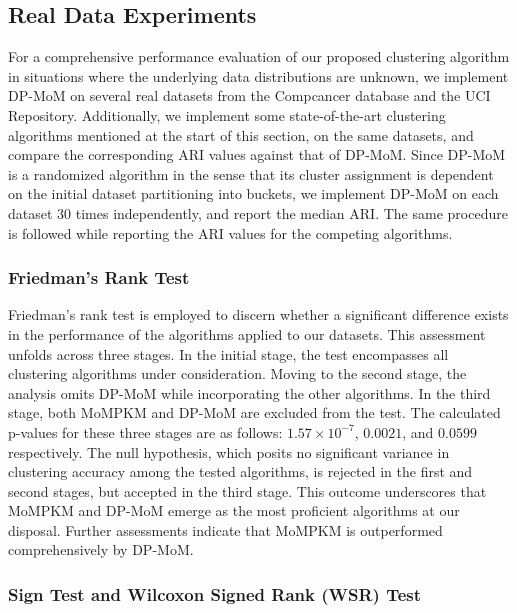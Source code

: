 \documentclass[12pt]{article}
\begin{document}
\subsection{Real Data Experiments}




For a comprehensive performance evaluation of our proposed clustering algorithm in situations where the underlying data distributions are unknown, we implement DP-MoM on several real datasets from the Compcancer database and the UCI Repository. Additionally, we implement some state-of-the-art clustering algorithms mentioned at the start of this section, on the same datasets, and compare the corresponding ARI values against that of DP-MoM. Since DP-MoM is a randomized algorithm in the sense that its cluster assignment is dependent on the initial dataset partitioning into buckets, we implement DP-MoM on each dataset $30$ times independently, and report the median ARI. The same procedure is followed while reporting the ARI values for the competing algorithms.

\subsubsection{Friedman's Rank Test} 
Friedman's rank test \cite{friedman} is employed to discern whether a significant difference exists in the performance of the algorithms applied to our datasets. This assessment unfolds across three stages. In the initial stage, the test encompasses all clustering algorithms under consideration. Moving to the second stage, the analysis omits DP-MoM while incorporating the other algorithms. In the third stage, both MoMPKM and DP-MoM are excluded from the test. The calculated p-values for these three stages are as follows: $1.57 \times 10^{-7}$, $0.0021$, and $0.0599$ respectively. The null hypothesis, which posits no significant variance in clustering accuracy among the tested algorithms, is rejected in the first and second stages, but accepted in the third stage. This outcome underscores that MoMPKM and DP-MoM emerge as the most proficient algorithms at our disposal. Further assessments indicate that MoMPKM is outperformed comprehensively by DP-MoM. 

\subsubsection{Sign Test and Wilcoxon Signed Rank (WSR) Test}
\end{document}
